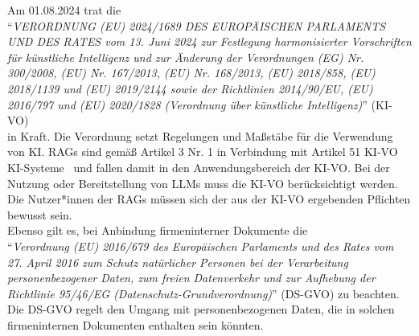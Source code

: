 Am 01.08.2024 trat die \\
\enquote{\textit{VERORDNUNG (EU) 2024/1689 DES EUROPÄISCHEN PARLAMENTS UND DES RATES vom 13. Juni 2024 zur Festlegung harmonisierter Vorschriften für künstliche Intelligenz und zur Änderung der Verordnungen (EG) Nr. 300/2008, (EU) Nr. 167/2013, (EU) Nr. 168/2013, (EU) 2018/858, (EU) 2018/1139 und (EU) 2019/2144 sowie der Richtlinien 2014/90/EU, (EU) 2016/797 und (EU) 2020/1828 (Verordnung über künstliche Intelligenz)}} (KI-VO)~\cite{european_commission_ai_act}\\
in Kraft.
Die Verordnung setzt Regelungen und Maßstäbe für die Verwendung von KI.
RAGs sind gemäß Artikel 3 Nr. 1 in Verbindung mit Artikel 51 KI-VO KI-Systeme~\cite{Martini2024KIVO} und fallen damit in den Anwendungsbereich der KI-VO.
Bei der Nutzung oder Bereitstellung von LLMs muss die KI-VO berücksichtigt werden.
Die Nutzer*innen der RAGs müssen sich der aus der KI-VO ergebenden Pflichten bewusst sein.\\
Ebenso gilt es, bei Anbindung firmeninterner Dokumente die\\
\enquote{\textit{Verordnung (EU) 2016/679 des Europäischen Parlaments und des Rates vom 27. April 2016 zum Schutz natürlicher Personen bei der Verarbeitung personenbezogener Daten, zum freien Datenverkehr und zur Aufhebung der Richtlinie 95/46/EG (Datenschutz-Grundverordnung)}} (DS-GVO) zu beachten.
Die DS-GVO regelt den Umgang mit personenbezogenen Daten, die in solchen firmeninternen Dokumenten enthalten sein könnten.
